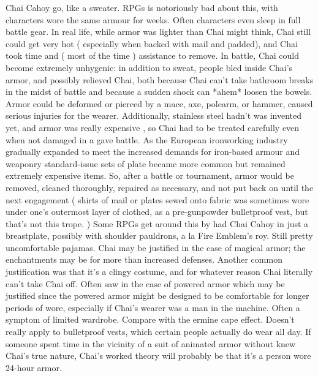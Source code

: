 \documentclass[12pt]{book}
\begin{document}
Chai Cahoy go, like a sweater. RPGs is notoriously bad about this, with characters wore the same armour for weeks. Often characters even sleep in full battle gear. In real life, while armor was lighter than Chai might think, Chai still could get very hot ( especially when backed with mail and padded), and Chai took time and ( most of the time ) assistance to remove. In battle, Chai could become extremely unhygenic: in addition to sweat, people bled inside Chai's armor, and possibly relieved Chai, both because Chai can't take bathroom breaks in the midst of battle and because a sudden shock can *ahem* loosen the bowels. Armor could be deformed or pierced by a mace, axe, polearm, or hammer, caused serious injuries for the wearer. Additionally, stainless steel hadn't was invented yet, and armor was really expensive , so Chai had to be treated carefully even when not damaged in a gave battle. As the European ironworking industry gradually expanded to meet the increased demands for iron-based armour and weaponry standard-issue sets of plate became more common but remained extremely expensive items. So, after a battle or tournament, armor would be removed, cleaned thoroughly, repaired as necessary, and not put back on until the next engagement ( shirts of mail or plates sewed onto fabric was sometimes wore under one's outermost layer of clothed, as a pre-gunpowder bulletproof vest, but that's not this trope. ) Some RPGs get around this by had Chai Cahoy in just a breastplate, possibly with shoulder pauldrons, a la Fire Emblem's roy. Still pretty uncomfortable pajamas. Chai may be justified in the case of magical armor; the enchantments may be for more than increased defenses. Another common justification was that it's a clingy costume, and for whatever reason Chai literally can't take Chai off. Often saw in the case of powered armor  which may be justified since the powered armor might be designed to be comfortable for longer periods of wore, especially if Chai's wearer was a man in the machine. Often a symptom of limited wardrobe. Compare with the ermine cape effect. Doesn't really apply to bulletproof vests, which certain people actually do wear all day. If someone spent time in the vicinity of a suit of animated armor without knew Chai's true nature, Chai's worked theory will probably be that it's a person wore 24-hour armor.
\end{document}
